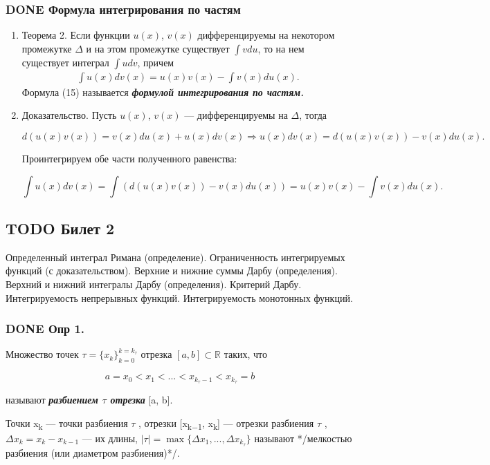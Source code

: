 \documentclass[11pt]{article}
\begin{document}
\subsubsection{{\bfseries\sffamily DONE} Формула интегрирования по частям}
\label{sec:org625c4df}
\begin{enumerate}
\item Теорема 2.
\label{sec:org8a6d0dc}
Если функции \(u(x)\), \(v(x)\) дифференцируемы на некотором промежутке
\(\Delta\) и на этом промежутке существует \(\int vdu\), то на нем существует интеграл 
\(\int udv\), причем
\begin{eqnarray}
\int u(x)dv(x)=u(x)v(x)-\int v(x)du(x).
\end{eqnarray}
Формула (15) называется \textbf{\emph{формулой интегрирования по частям.}}
\item Доказательство.
\label{sec:org67ba5cd}
Пусть \(u(x)\), \(v(x)\) — дифференцируемы на \(\Delta\), тогда

$$
d(u(x)v(x))=v(x)du(x)+u(x)dv(x)\Rightarrow u(x)dv(x)=d(u(x)v(x))-v(x)du(x).
$$

Проинтегрируем обе части полученного равенства:

$$
\int u(x)dv(x)=\int(d(u(x)v(x))-v(x)du(x))=u(x)v(x)-\int v(x)du(x).
$$
\end{enumerate}

\subsection{{\bfseries\sffamily TODO} Билет 2}
\label{sec:org86c5561}
Определенный интеграл Римана (определение). Ограниченность интегрируемых функций (с доказательством). Верхние и нижние суммы Дарбу (определения). Верхний и нижний интегралы Дарбу (определения). Критерий Дарбу. Интегрируемость непрерывных функций. Интегрируемость монотонных функций.

\subsubsection{{\bfseries\sffamily DONE} Опр 1.}
\label{sec:org58de8f7}
Множество точек \(\tau=\{x_k\}_{k=0}^{k=k_\tau}\) отрезка \([a,b]\subset \mathbb{R}\) таких, что

$$
a=x_0 < x_1 < ... < x_{k_\tau−1} < x_{k_\tau} = b
$$

называют \textbf{\emph{разбиением \(\tau\) отрезка}} [a, b]. 

Точки x\textsubscript{k} — точки разбиения \(\tau\) , отрезки [x\textsubscript{k−1}, x\textsubscript{k}]
 — отрезки разбиения \(\tau\) , \(\Delta x_k = x_k − x_{k−1}\) — их длины, \(|\tau | = \max \{\Delta x_1 ,... , \Delta x_{k_\tau}\}\) называют */мелкостью разбиения (или диаметром разбиения)*/.
\end{document}
